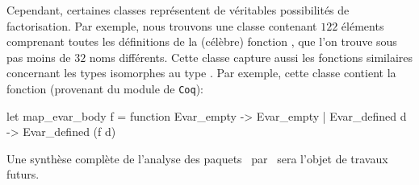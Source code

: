 Cependant, certaines classes représentent de véritables possibilités
de factorisation. Par exemple, nous trouvons une classe contenant
$122$ éléments comprenant toutes les définitions de la (célèbre)
fonction , que l'on trouve sous pas moins de $32$
noms différents. Cette classe capture aussi les fonctions similaires
concernant les types isomorphes au type . Par exemple,
cette classe contient la fonction  (provenant du
module  de \verb|Coq|):

\begin{ocaml}
let map_evar_body f =
  function Evar_empty -> Evar_empty | Evar_defined d -> Evar_defined (f d)
\end{ocaml}

Une synthèse complète de l'analyse des paquets~{\Opam} par~{\Asak} sera l'objet
de travaux futurs.
